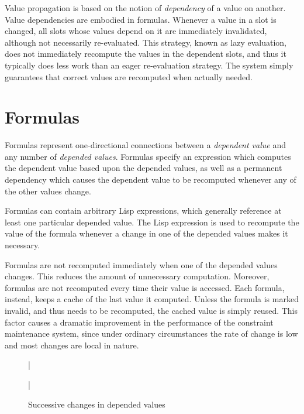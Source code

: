 Value propagation is based on the notion of {\it dependency} of a value
on another.  Value dependencies are embodied in formulas.  Whenever a
value in a slot is changed, all slots whose values depend on it are
immediately invalidated, although not necessarily re-evaluated.  This
strategy, known as lazy evaluation, does not immediately recompute the
values in the dependent slots, and thus it typically does less
work than an
eager re-evaluation strategy.  The system simply
guarantees that correct
values are recomputed when actually needed.



\section{Formulas}
\value{s-top}

Formulas represent one-directional connections between a
{\it dependent value} and any number of {\it depended values}.  Formulas
specify an expression which computes the dependent value based upon the
depended values, as well as a permanent dependency which causes the
dependent value to be recomputed whenever any of the other values change.

Formulas can contain arbitrary Lisp expressions, which generally
reference at least one particular depended value.  The Lisp
expression is used to recompute the value of the formula whenever a
change in one of the depended values makes it necessary.

Formulas are not recomputed immediately when one of
the depended values changes.  This reduces the amount of unnecessary
computation.  Moreover, formulas are not recomputed every time their value
is accessed.  Each formula, instead, keeps a cache of the last value it
computed.  Unless the formula is marked invalid, and thus needs to be
recomputed, the cached value is simply reused.  This
factor causes a dramatic improvement in the performance of the constraint
maintenance system, since under ordinary circumstances the rate of change
is low and most changes are local in nature.

\begin{figure}
\bar{}
\begin{center}
\end{center}
\caption{Successive changes in depended values}
\bar{}
\end{figure}


